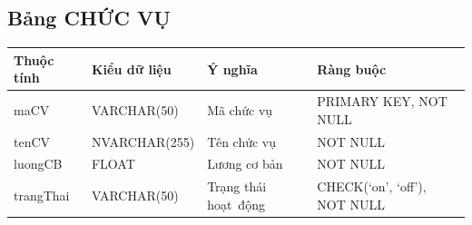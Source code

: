 \documentclass[a4paper,12pt]{report}
\begin{document}
\subsection{Bảng CHỨC VỤ}
\noindent
\begin{center}
    \begin{tabular}{|>{\centering\arraybackslash}p{3cm}|
        >{\centering\arraybackslash}p{4cm}|
        >{\centering\arraybackslash}p{4cm}|
        >{\centering\arraybackslash}p{4cm}|}
        \hline
        \textbf{Thuộc tính}                                                                                                               &
        \textbf{Kiểu dữ liệu}                                                                                                                             &
        \textbf{Ý nghĩa}                                                                                                 &
        \textbf{Ràng buộc}                                                                                                         \\
        \hline
        maCV &  VARCHAR(50)  & Mã chức vụ & PRIMARY KEY, NOT NULL \\
        \hline
        tenCV &  NVARCHAR(255)  & Tên chức vụ & NOT NULL \\                                                                                                                          
        \hline
        luongCB & FLOAT & Lương cơ bản & NOT NULL \\                                                                                                                          
        \hline
        trangThai &  VARCHAR(50)  & Trạng thái hoạt~động & CHECK(‘on’, ‘off’), NOT NULL \\
        \hline
    \end{tabular}
\end{center}
\end{document}
